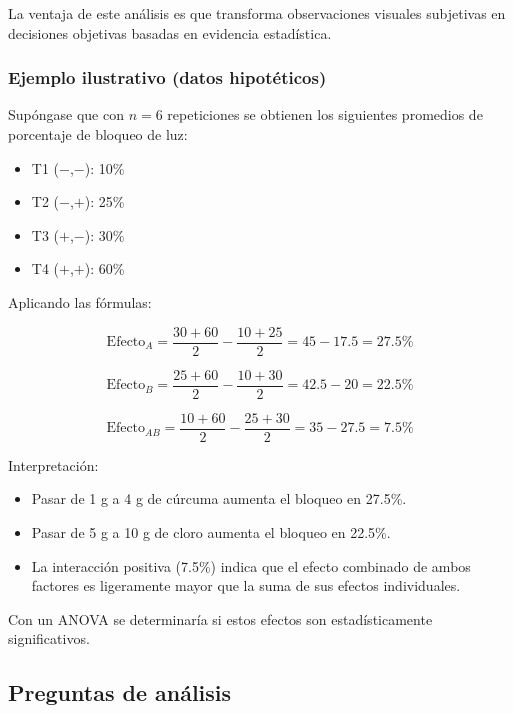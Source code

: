 La ventaja de este análisis es que transforma observaciones visuales subjetivas en decisiones objetivas basadas en evidencia estadística.

\subsubsection{Ejemplo ilustrativo (datos hipotéticos)}

Supóngase que con $n=6$ repeticiones se obtienen los siguientes promedios de porcentaje de bloqueo de luz:

\begin{itemize}
\item T1 ($-$,$-$): 10\%
\item T2 ($-$,$+$): 25\%
\item T3 ($+$,$-$): 30\%
\item T4 ($+$,$+$): 60\%
\end{itemize}

Aplicando las fórmulas:

\[
\text{Efecto}_A = \frac{30+60}{2} - \frac{10+25}{2} = 45 - 17.5 = 27.5\%
\]

\[
\text{Efecto}_B = \frac{25+60}{2} - \frac{10+30}{2} = 42.5 - 20 = 22.5\%
\]

\[
\text{Efecto}_{AB} = \frac{10+60}{2} - \frac{25+30}{2} = 35 - 27.5 = 7.5\%
\]

Interpretación:
\begin{itemize}
\item Pasar de 1 g a 4 g de cúrcuma aumenta el bloqueo en 27.5\%.
\item Pasar de 5 g a 10 g de cloro aumenta el bloqueo en 22.5\%.
\item La interacción positiva (7.5\%) indica que el efecto combinado de ambos factores es ligeramente mayor que la suma de sus efectos individuales.
\end{itemize}

Con un ANOVA se determinaría si estos efectos son estadísticamente significativos.

\subsection{Preguntas de análisis}

